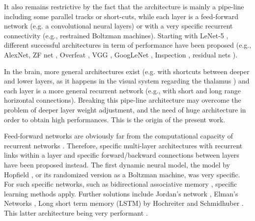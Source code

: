 It also remains restrictive by the fact that the architecture is
mainly a pipe-line including some parallel tracks or short-cuts, while each layer is
a feed-forward network (e.g. a convolutional neural layers) or with a
very specific recurrent connectivity (e.g., restrained Boltzman
machines).  Starting with LeNet-5 \cite{Lecun1998Gradient}, different
successful architectures in term of performance have been proposed (e.g.,
AlexNet\cite{Krizhevsky2012Imagenet}, ZF net
\cite{Zeiler2014Visualizing}, Overfeat \cite{Sermanet2013Overfeat},
VGG \cite{Simonyan2015Very}, GoogLeNet \cite{Szegedy2014Going},
Inspection \cite{Szegedy2016Inception}, residual nets
\cite{He2016Deep}).

In the brain, more general architectures exist (e.g.  with shortcuts
between deeper and lower layers, as it happens in the visual system
regarding the thalamus \cite{citeulike:1590763}) and each layer is a
more general recurrent network (e.g., with short and long range
horizontal connections). Breaking this pipe-line architecture may
overcome the problem of deeper layer weight adjustment, and the need
of huge architecture in order to obtain high performances. 
This is the origin of the present work.

Feed-forward networks are obviously far from the computational
capacity of recurrent networks
\cite{Goodfellow2016Deep,Schmidhuber:2015,cessac_view_2010}.
Therefore, specific multi-layer architectures with recurrent links
within a layer and specific forward/backward connections between
layers have been proposed instead. The first dynamic neural model, the
model by Hopfield \cite{hopfield:82}, or its randomized version as a
Boltzman machine, was very specific. For such specific networks, such
as bidirectional associative memory
\cite{Acevedo-Mosqueda:2013:BAM:2431211.2431217}, specific learning
methods apply. Further solutions include Jordan's network
\cite{jordan:86}, Elman's Networks \cite{elman:90}, Long short term
memory (LSTM) by Hochreiter and Schmidhuber
\cite{hochreiter-schmidhuber:97}. This latter architecture being very
performant \cite{Schmidhuber:2015}.

